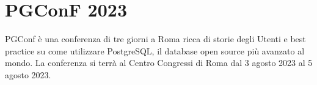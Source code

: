 \section{PGConF 2023}
PGConf è una conferenza di tre giorni a Roma ricca di storie degli Utenti e best practice su come utilizzare PostgreSQL, il database open source più avanzato al mondo. La conferenza si terrà al Centro Congressi di Roma dal 3 agosto 2023 al 5 agosto 2023.